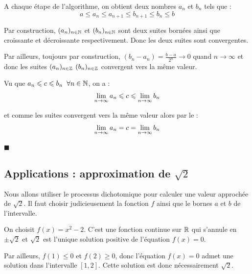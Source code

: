 \documentclass[11pt,a4paper,twoside,greek]{report}
\begin{document}
\smallskip


\begin{demonstration}

A chaque étape de l'algorithme, on obtient deux nombres $a_n$ et $b_n$ tels que :
$$a\leqslant a_{n} \leqslant a_{n+1} \leqslant b_{n+1}\leqslant  b_n \leqslant b$$



Par construction, $(a_n)_{n\in \N}$ et $(b_n)_{n\in \N}$ sont deux suites bornées ainsi que croissante et décroissante respectivement. Donc les deux suites sont convergentes.

\medskip
Par ailleurs, toujours par construction, $(b_n-a_n)=\frac{b-a}{2^n} \to 0$ quand $n\to \infty$ et donc les suites $(a_n)_{n\in \Z}$  $(b_n)_{n\in \Z}$ convergent vers la même valeur. 

\medskip
Vu que $a_n\leqslant c\leqslant b_n\eh{2} \forall n\in\N$, on a :
$$\lin{\infty} a_n\leqslant c\leqslant \lin{\infty} b_n$$

\medskip
et comme les suites convergent vers la même valeur alors par le   :
$$\lin{\infty} a_n=c=\lin{\infty} b_n$$

\vspace{-3mm}
\hfill $\blacksquare$
\end{demonstration}




\subsection{Applications : approximation de  $\sqrt{2}$}

Nous allons utiliser le processus dichotomique pour calculer une valeur approchée de $\sqrt{2}$. Il faut choisir judicieusement la fonction $f$ ainsi que le bornes $a$ et $b$ de l'intervalle.

\medskip
On choisit $f(x)=x^2-2$. C'est une fonction continue sur $\R$ qui s'annule en $\pm\sqrt{2}$ et $\sqrt{2}$ est l'unique solution positive de l'équation $f(x)=0$.

\medskip
Par ailleurs, $f(1) \leqslant 0$ et $f(2) \geqslant 0$, donc l'équation $f(x)=0$ admet une solution dans l'intervalle $[1,2]$. Cette solution est donc nécessairement $\sqrt{2}$.


\end{document}
